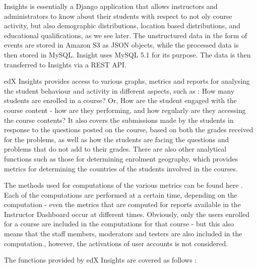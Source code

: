 \documentclass[14pt]{article}
\begin{document}
Insights is essentially a Django application that allows instructors and administrators to know about their students with respect to not oly course activity, but also demographic distributions, location based distributions, and educational qualifications, as we see later. The unstructured data in the form of events are stored in Amazon S3 as JSON objects, while the processed data is then stored in MySQL. Insight uses MySQL 5.1 for its purpose. The data is then transferred to Insights via a REST API.

edX Insights provides access to various graphs, metrics and reports for analysing the student behaviour and activity in different aspects, such as : How many students are enrolled in a course? Or, How are the student engaged with the course content - how are they performing, and how regularly are they accessing the course contents? It also covers the submissions made by the students in response to the questions posted on the course, based on both the grades received for the problems, as well as how the students are facing the questions and problems that do not add to their grades. There are also other analytical functions such as those for determining enrolment geography, which provides metrics for determining the countries of the students involved in the courses.

The methods used for computations of the various metrics can be found here \cite{edXInsightsCompRef}. Each of the computations are performed at a certain time, depending on the computation - even the metrics that are computed for reports available in the Instructor Dashboard occur at different times. Obviously, only the users enrolled for a course are included in the computations for that course - but this also means that the staff members, moderators and testers are also included in the computation., however, the activations of user accounts is not considered.

The functions provided by edX Insights are covered as follows \cite{edXInsights}:
\end{document}
